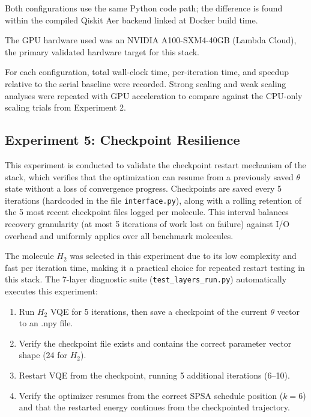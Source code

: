 Both configurations use the same Python code path; the difference is found within the compiled Qiskit Aer backend linked at Docker build time.

The GPU hardware used was an NVIDIA A100-SXM4-40GB (Lambda Cloud), the primary validated hardware target for this stack.  

For each configuration, total wall-clock time, per-iteration time, and speedup relative to the serial baseline 
were recorded. Strong scaling and weak scaling analyses were repeated with GPU acceleration to compare against 
the CPU-only scaling trials from Experiment 2.



\subsection{Experiment 5: Checkpoint Resilience}
This experiment is conducted to validate the checkpoint restart mechanism of the stack, which verifies that 
the optimization can resume from a previously saved $\theta$ state without a loss of convergence progress. Checkpoints 
are saved every 5 iterations (hardcoded in the file \texttt{interface.py}), along with a rolling retention of the 5 most recent 
checkpoint files logged per molecule. This interval balances recovery granularity (at most 5 iterations 
of work lost on failure) against I/O overhead and uniformly applies over all benchmark molecules. 

The molecule $H_{2}$ was selected in this experiment due to its low complexity and fast per iteration time, making it a 
practical choice for repeated restart testing in this stack. The 7-layer diagnostic suite (\texttt{test\_layers\_run.py}) automatically executes this experiment:

\begin{enumerate}
    \item Run $H_{2}$ VQE for 5 iterations, then save a checkpoint of the current $\theta$ vector to an .npy file.
    \item Verify the checkpoint file exists and contains the correct parameter vector shape (24 for $H_{2}$).
    \item Restart VQE from the checkpoint, running 5 additional iterations (6--10).
    \item Verify the optimizer resumes from the correct SPSA schedule position ($k=6$) and that the restarted energy continues from the checkpointed trajectory.
\end{enumerate}

